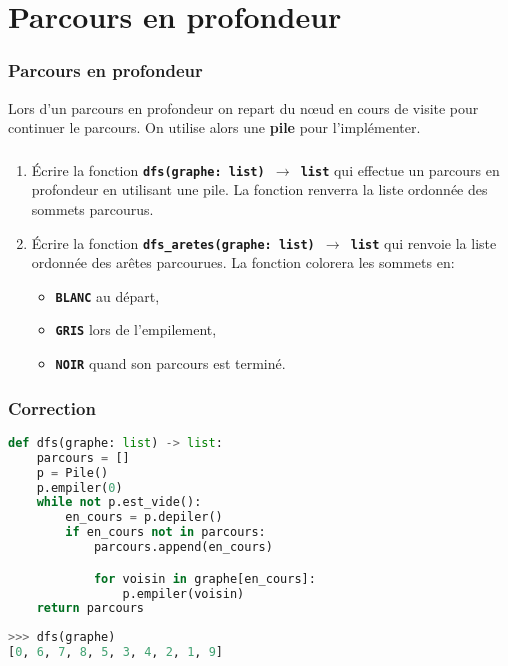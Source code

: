 \documentclass[svgnames,11pt]{beamer}
\begin{document}
\section{Parcours en profondeur}
\begin{frame}
    \frametitle{Parcours en profondeur}

\begin{aretenir}[]
Lors d'un parcours en profondeur on repart du nœud en cours de visite pour continuer le parcours. On utilise alors une \textbf{pile} pour l'implémenter.
\end{aretenir}

\end{frame}
\begin{frame}
    \frametitle{}
\begin{activite}
\begin{enumerate}
    \item Écrire la fonction \textbf{\texttt{dfs(graphe: list) $\rightarrow$ list}} qui effectue un parcours en profondeur en utilisant une pile. La fonction renverra la liste ordonnée des sommets parcourus.
    \item Écrire la fonction \textbf{\texttt{dfs\_aretes(graphe: list) $\rightarrow$ list}} qui renvoie la liste ordonnée des arêtes parcourues. La fonction colorera les sommets en:
    \begin{itemize}
        \item \textbf{\texttt{BLANC}} au départ,
        \item \textbf{\texttt{GRIS}} lors de l'empilement,
        \item \textbf{\texttt{NOIR}} quand son parcours est terminé.
    \end{itemize}
\end{enumerate}
\end{activite}
    

\end{frame}
\begin{frame}[fragile]
    \frametitle{Correction}
\begin{center}
\begin{lstlisting}[language=Python , basicstyle=\ttfamily\small, xleftmargin=2em, xrightmargin=2em]
def dfs(graphe: list) -> list:
    parcours = []
    p = Pile()
    p.empiler(0)
    while not p.est_vide():
        en_cours = p.depiler()
        if en_cours not in parcours:
            parcours.append(en_cours)

            for voisin in graphe[en_cours]:
                p.empiler(voisin)
    return parcours
\end{lstlisting}
\begin{lstlisting}[language=Python , basicstyle=\ttfamily\small, xleftmargin=2em, xrightmargin=2em]
>>> dfs(graphe)
[0, 6, 7, 8, 5, 3, 4, 2, 1, 9]
\end{lstlisting}
\label{CODE}
\end{center}
    

\end{frame}
\end{document}
